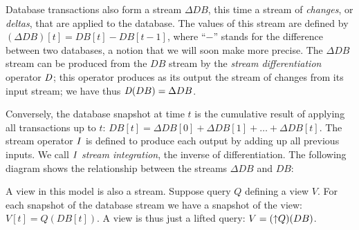 Database transactions also form a stream $\Delta DB$, this time a
stream of \emph{changes}, or \emph{deltas}, that are applied to the
database.  The values of this stream are defined by $(\Delta DB)[t] =
DB[t] - DB[t-1]$, where ``$-$'' stands for the difference between two
databases, a notion that we will soon make more precise.  The $\Delta
DB$ stream can be produced from the $DB$ stream by the \emph{stream
differentiation} operator $\mathit{D}$; this operator produces as its output
the stream of changes from its input stream; we have thus $\mathit{D}(DB) =
\Delta DB$.

Conversely, the database snapshot at time $t$ is the cumulative result
of applying all transactions up to $t$: $DB[t] = \Delta DB[0] + \Delta
DB[1] + \ldots + \Delta DB[t]$.  The stream operator $\mathit{I}$ is defined
to produce each output by adding up all previous inputs.  We call $\mathit{I}$
\emph{stream integration}, the inverse of differentiation.  The
following diagram shows the relationship between the streams $\Delta
DB$ and $DB$:
\begin{center}
\end{center}

A view in this model is also a stream.  Suppose query $Q$ defining a
view $V$.  For each snapshot of the database stream we have a snapshot
of the view: $V[t] = Q(DB[t])$.  A view is thus just a lifted query:
$V = ({\uparrow}Q)(DB)$.

